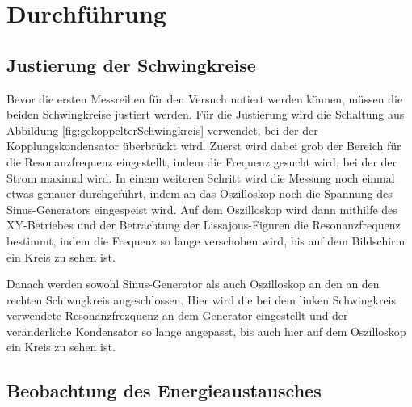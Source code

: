 


\section{Durchführung}

\subsection{Justierung der Schwingkreise}

Bevor die ersten Messreihen für den Versuch notiert werden können, müssen die beiden
Schwingkreise justiert werden. Für die Justierung wird die Schaltung aus Abbildung \ref{fig:gekoppelterSchwingkreis}
verwendet, bei der der Kopplungskondensator überbrückt wird. Zuerst wird dabei
grob der Bereich für die Resonanzfrequenz eingestellt,
indem die Frequenz gesucht wird, bei der der Strom maximal wird. In einem weiteren
Schritt wird die Messung noch einmal etwas genauer durchgeführt, indem an das
Oszilloskop noch die Spannung des Sinus-Generators eingespeist wird. Auf dem Oszilloskop
wird dann mithilfe des XY-Betriebes und der Betrachtung der Lissajous-Figuren die
Resonanzfrequenz bestimmt, indem die Frequenz so lange verschoben wird, bis auf
dem Bildschirm ein Kreis zu sehen ist.

Danach werden sowohl Sinus-Generator als
auch Oszilloskop an den an den rechten Schiwngkreis angeschlossen. Hier wird die
bei dem linken Schwingkreis verwendete Resonanzfrezquenz an dem Generator eingestellt
und der veränderliche Kondensator so lange angepasst, bis auch hier auf dem Oszilloskop
ein Kreis zu sehen ist.

\subsection{Beobachtung des Energieaustausches}

